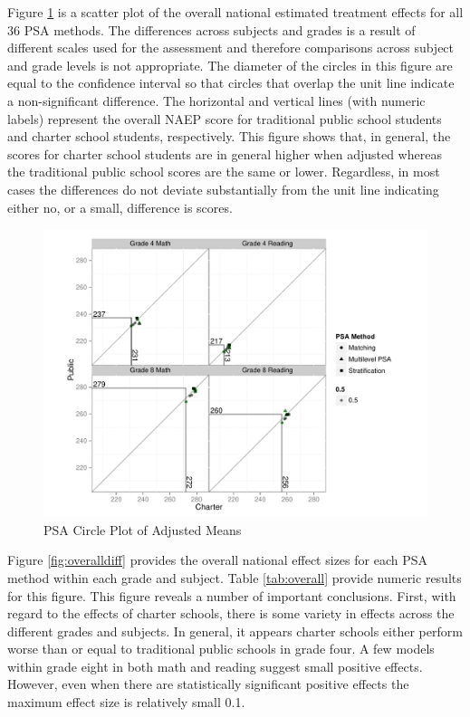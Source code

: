 \documentclass[letterpaper,12p,twoside]{article} %
\begin{document}
Figure \ref{fig:overallcirc} is a scatter plot of the overall national estimated treatment effects for all 36 PSA methods. The differences across subjects and grades is a result of different scales used for the assessment and therefore comparisons across subject and grade levels is not appropriate. The diameter of the circles in this figure are equal to the confidence interval so that circles that overlap the unit line indicate a non-significant difference. The horizontal and vertical lines (with numeric labels) represent the overall NAEP score for traditional public school students and charter school students, respectively. This figure shows that, in general, the scores for charter school students are in general higher when adjusted whereas the traditional public school scores are the same or lower. Regardless, in most cases the differences do not deviate substantially from the unit line indicating either no, or a small, difference is scores. 

\begin{figure}[t]
\begin{center}
\includegraphics[width=\textwidth]{../Figures2009/OverallScatter.pdf}
\caption{PSA Circle Plot of Adjusted Means}
\label{fig:overallcirc}
\end{center}
\end{figure}

Figure \ref{fig:overalldiff} provides the overall national effect sizes for each PSA method within each grade and subject. Table \ref{tab:overall} provide numeric results for this figure. This figure reveals a number of important conclusions. First, with regard to the effects of charter schools, there is some variety in effects across the different grades and subjects. In general, it appears charter schools either perform worse than or equal to traditional public schools in grade four. A few models within grade eight in both math and reading suggest small positive effects. However, even when there are statistically significant positive effects the maximum effect size is relatively small 0.1. 
\end{document}
